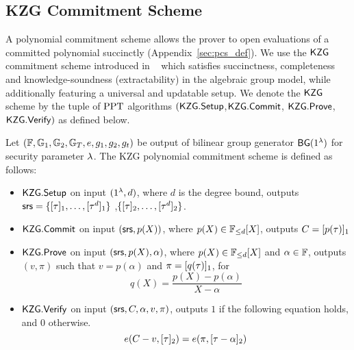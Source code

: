\subsection{KZG Commitment Scheme}
\label{sec:KZG}
A polynomial commitment scheme allows the prover to open evaluations of a committed polynomial succinctly (Appendix~\ref{sec:pcs_def}).
We use the $\mathsf{KZG}$ commitment scheme introduced in ~\cite{AC:KatZavGol10} which satisfies succinctness, completeness and knowledge-soundness (extractability)
in the algebraic group model, while additionally featuring a universal and updatable setup. We denote the $\mathsf{KZG}$ scheme by the tuple of $\mathrm{PPT}$ algorithms $(\mathsf{KZG.Setup}$,$\mathsf{KZG.Commit}$, $\mathsf{KZG.Prove}$, $\mathsf{KZG.Verify})$ as defined below.
\begin{definition}
	Let $(\mathbb{F},\mathbb{G}_1,\mathbb{G}_2,\mathbb{G}_T, e, g_1, g_2, g_t)$ be output of bilinear group generator $\mathsf{BG}(1^{\lambda})$ for security parameter $\lambda$.
	The KZG polynomial commitment scheme is defined as follows:
	\begin{itemize}[leftmargin=1em]
		\item $\mathsf{KZG.Setup}$ on input $(1^{\lambda},d)$, where $d$ is the degree bound, outputs
		$\mathsf{srs} = \{[\tau]_1,\ldots,[\tau^d]_1\}$ ,$\{[\tau]_2,\ldots,[\tau^d]_2\}$.
		\item $\mathsf{KZG.Commit}$ on input $(\mathsf{srs},p(X))$, where $p(X) \in \mathbb{F}_{\leq d}[X]$, outputs $C=[p(\tau)]_1$
		\item $\mathsf{KZG.Prove}$ on input $(\mathsf{srs},p(X),\alpha)$, where $p(X) \in \mathbb{F}_{\leq d}[X]$ and $\alpha\in \mathbb{F}$, outputs $(v, \pi)$ such that $v=p(\alpha)$ and $\pi=[q(\tau)]_1$, for
		\[ q(X)=\frac{p(X)-p(\alpha)}{X-\alpha} \]
		\item $\mathsf{KZG.Verify}$ on input $(\mathsf{srs},C,\alpha,v,\pi)$, outputs $1$ if the following equation holds, and $0$ otherwise.
		\[ e(C-v, [\tau]_2) = e(\pi, [\tau-\alpha]_2) \]
	\end{itemize}
\end{definition}

